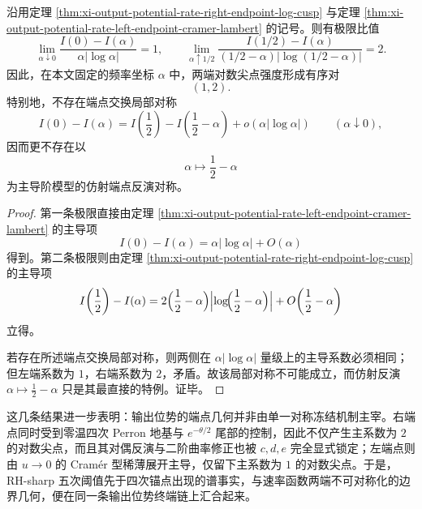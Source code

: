 \begin{corollary}[输出位势速率函数两端尖点强度的刚性不对称]\label{cor:xi-output-potential-endpoint-log-cusp-rigidity-pair}
沿用定理 \ref{thm:xi-output-potential-rate-right-endpoint-log-cusp} 与定理 \ref{thm:xi-output-potential-rate-left-endpoint-cramer-lambert} 的记号。则有极限比值
\[
\boxed{\;
\lim_{\alpha\downarrow0}\frac{I(0)-I(\alpha)}{\alpha|\log\alpha|}=1,
\qquad
\lim_{\alpha\uparrow1/2}\frac{I(1/2)-I(\alpha)}{(1/2-\alpha)|\log(1/2-\alpha)|}=2.\;}
\]
因此，在本文固定的频率坐标 \(\alpha\) 中，两端对数尖点强度形成有序对
\[
\boxed{\;(1,2).\;}
\]
特别地，不存在端点交换局部对称
\[
I(0)-I(\alpha)=I\!\left(\frac12\right)-I\!\left(\frac12-\alpha\right)+o(\alpha|\log\alpha|)
\qquad
(\alpha\downarrow0),
\]
因而更不存在以
\[
\alpha\longmapsto \frac12-\alpha
\]
为主导阶模型的仿射端点反演对称。
\end{corollary}
\begin{proof}
第一条极限直接由定理 \ref{thm:xi-output-potential-rate-left-endpoint-cramer-lambert} 的主导项
\[
I(0)-I(\alpha)=\alpha|\log\alpha|+O(\alpha)
\]
得到。第二条极限则由定理 \ref{thm:xi-output-potential-rate-right-endpoint-log-cusp} 的主导项
\[
I\!\left(\frac12\right)-I(\alpha)
=
2\Bigl(\frac12-\alpha\Bigr)\Bigl|\log\!\Bigl(\frac12-\alpha\Bigr)\Bigr|
+O\!\left(\frac12-\alpha\right)
\]
立得。

若存在所述端点交换局部对称，则两侧在 \(\alpha|\log\alpha|\) 量级上的主导系数必须相同；但左端系数为 \(1\)，右端系数为 \(2\)，矛盾。故该局部对称不可能成立，而仿射反演 \(\alpha\mapsto\frac12-\alpha\) 只是其最直接的特例。证毕。
\end{proof}

\noindent 这几条结果进一步表明：输出位势的端点几何并非由单一对称冻结机制主宰。右端点同时受到零温四次 Perron 地基与 \(e^{-\theta/2}\) 尾部的控制，因此不仅产生主系数为 \(2\) 的对数尖点，而且其对偶反演与二阶曲率修正也被 \(c,d,e\) 完全显式锁定；左端点则由 \(u\to0\) 的 Cram\'er 型稀薄展开主导，仅留下主系数为 \(1\) 的对数尖点。于是，RH-sharp 五次阈值先于四次锚点出现的谱事实，与速率函数两端不可对称化的边界几何，便在同一条输出位势终端链上汇合起来。

\endinput
